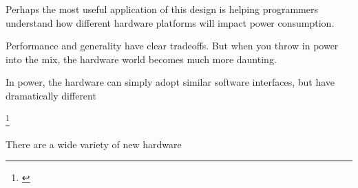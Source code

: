 \documentclass[12pt,twoside]{reedthesis}
\begin{document}
		Perhaps the most useful application of this design is helping programmers understand how different hardware platforms will impact power consumption. 
		
		Performance and generality have clear tradeoffs. But when you throw in power into the mix, the hardware world becomes much more daunting.
		
		In power, the hardware can simply adopt similar software interfaces, but have dramatically different 
		
		\footnote{\cite{Taylor:2013}}
		
		There are a wide variety of new hardware 
		
		
		
		
		
		
		
		
		
\end{document}
